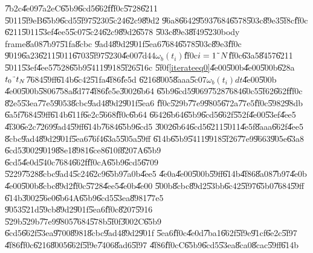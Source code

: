 \bigskip

\U{7b2c}\U{4e09}\U{7a2e}C\U{65b9}\U{6cd5}\U{662f}\U{ff0c}\U{5728}\U{6211}%
\U{5011}\U{5f9e}B\U{65b9}\U{6cd5}\U{5f97}\U{5230}\U{5c24}\U{62c9}\U{89d2}%
\U{96a8}\U{6642}\U{9593}\U{7684}\U{6578}\U{503c}\U{89e3}\U{5f8c}\U{ff0c}%
\U{6211}\U{5011}\U{53ef}\U{4ee5}\U{5c07}\U{5c24}\U{62c9}\U{89d2}\U{6578}%
\U{503c}\U{89e3}\U{8f49}\U{5230}body frame\U{8a08}\U{7b97}\U{51fa}\U{8cbc}%
\U{9ad4}\U{89d2}\U{901f}\U{5ea6}\U{7684}\U{6578}\U{503c}\U{89e3}\U{ff0c}%
\U{9019}\U{6a23}\U{6211}\U{5011}\U{6703}\U{5f97}\U{5230}\U{4e00}\U{7d44}$%
\omega _{b}(t_{i})$\U{ff0c}$i=1\symbol{126}N$\U{ff0c}\U{63a5}\U{8457}\U{6211}%
\U{5011}\U{53ef}\U{4ee5}\U{7528}\U{65b9}\U{5411}\U{9918}\U{5f26}\U{516c}%
\U{5f0f}\ref{iterateeq0}\U{4e00}\U{500b}\U{4e00}\U{500b}\U{628a}$t_{0}%
\symbol{126}t_{N}$\U{7684}\U{59ff}\U{614b}\U{6c42}\U{51fa}\U{4f86}\U{fe5d}%
\U{6216}\U{8005}\U{8aaa}\U{5c07}$\omega _{b}(t_{i})dt$\U{4e00}\U{500b}%
\U{4e00}\U{500b}\U{5806}\U{758a}\U{8d77}\U{4f86}\U{fe5e}\U{3002}\U{6b64}%
\U{65b9}\U{6cd5}\U{9069}\U{7528}\U{7684}\U{60c5}\U{5f62}\U{662f}\U{ff0c}%
\U{82e5}\U{53ea}\U{77e5}\U{9053}\U{8cbc}\U{9ad4}\U{89d2}\U{901f}\U{5ea6}%
\U{ff0c}\U{529b}\U{77e9}\U{9805}\U{672a}\U{77e5}\U{ff0c}\U{5982}\U{98db}%
\U{6a5f}\U{7684}\U{59ff}\U{614b}\U{611f}\U{6e2c}\U{5668}\U{ff0c}\U{6b64}%
\U{6642}\U{6b64}\U{65b9}\U{6cd5}\U{662f}\U{552f}\U{4e00}\U{53ef}\U{4ee5}%
\U{4f30}\U{6e2c}\U{7269}\U{9ad4}\U{59ff}\U{614b}\U{7684}\U{65b9}\U{6cd5}%
\U{3002}\U{6b64}\U{6cd5}\U{6211}\U{5011}\U{4e5f}\U{8aaa}\U{662f}\U{4ee5}%
\U{8cbc}\U{9ad4}\U{89d2}\U{901f}\U{5ea6}\U{76f4}\U{63a5}\U{505a}\U{59ff}%
\U{614b}\U{65b9}\U{5411}\U{9918}\U{5f26}\U{77e9}\U{9663}\U{905e}\U{63a8}%
\U{6cd5}\U{3002}\U{9019}\U{88e1}\U{8981}\U{6ce8}\U{610f}\U{8207}A\U{65b9}%
\U{6cd5}\U{4e0d}\U{540c}\U{7684}\U{662f}\U{ff0c}A\U{65b9}\U{6cd5}\U{6709}%
\U{5229}\U{7528}\U{8cbc}\U{9ad4}\U{5c24}\U{62c9}\U{65b9}\U{7a0b}\U{4ee5}%
\U{4e0a}\U{4e00}\U{500b}\U{59ff}\U{614b}\U{4f86}\U{8a08}\U{7b97}\U{4e0b}%
\U{4e00}\U{500b}\U{8cbc}\U{89d2}\U{ff0c}\U{5728}\U{4ee5}\U{4e0b}\U{4e00}%
\U{500b}\U{8cbc}\U{89d2}\U{53bb}\U{6c42}\U{5f97}\U{65b0}\U{7684}\U{59ff}%
\U{614b}\U{3002}\U{56e0}\U{6b64}A\U{65b9}\U{6cd5}\U{53ea}\U{8981}\U{77e5}%
\U{9053}\U{521d}\U{59cb}\U{89d2}\U{901f}\U{5ea6}\U{ff0c}\U{8207}\U{5916}%
\U{529b}\U{529b}\U{77e9}\U{9805}\U{7684}\U{578b}\U{5f0f}\U{3002}C\U{65b9}%
\U{6cd5}\U{662f}\U{53ea}\U{9700}\U{8981}\U{8cbc}\U{9ad4}\U{89d2}\U{901f}%
\U{5ea6}\U{ff0c}\U{4e0d}\U{7ba1}\U{662f}\U{5f9e}\U{91cf}\U{6e2c}\U{5f97}%
\U{4f86}\U{ff0c}\U{6216}\U{8005}\U{662f}\U{5f9e}\U{7406}\U{8ad6}\U{5f97}%
\U{4f86}\U{ff0c}C\U{65b9}\U{6cd5}\U{53ea}\U{8ca0}\U{8cac}\U{59ff}\U{614b}%
